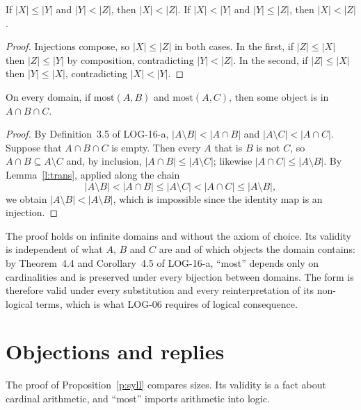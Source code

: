 \documentclass{situationist-preprint}
\begin{document}
\begin{lemma}\label{l:trans}
If $|X| \leq |Y|$ and $|Y| < |Z|$, then $|X| < |Z|$. If $|X| < |Y|$ and $|Y| \leq |Z|$, then $|X| < |Z|$.
\end{lemma}

\begin{proof}
Injections compose, so $|X| \leq |Z|$ in both cases. In the first, if $|Z| \leq |X|$ then $|Z| \leq |Y|$ by composition, contradicting $|Y| < |Z|$. In the second, if $|Z| \leq |X|$ then $|Y| \leq |X|$, contradicting $|X| < |Y|$.
\end{proof}

\begin{proposition}\label{p:syll}
On every domain, if $\mathrm{most}(A, B)$ and $\mathrm{most}(A, C)$, then some object is in $A \cap B \cap C$.
\end{proposition}

\begin{proof}
By Definition~3.5 of LOG-16-a, $|A \setminus B| < |A \cap B|$ and $|A \setminus C| < |A \cap C|$. Suppose that $A \cap B \cap C$ is empty. Then every $A$ that is $B$ is not $C$, so $A \cap B \subseteq A \setminus C$ and, by inclusion, $|A \cap B| \leq |A \setminus C|$; likewise $|A \cap C| \leq |A \setminus B|$. By Lemma~\ref{l:trans}, applied along the chain
\[
|A \setminus B| < |A \cap B| \leq |A \setminus C| < |A \cap C| \leq |A \setminus B|,
\]
we obtain $|A \setminus B| < |A \setminus B|$, which is impossible since the identity map is an injection.
\end{proof}

The proof holds on infinite domains and without the axiom of choice. Its validity is independent of what $A$, $B$ and $C$ are and of which objects the domain contains: by Theorem~4.4 and Corollary~4.5 of LOG-16-a, \enquote{most} depends only on cardinalities and is preserved under every bijection between domains. The form is therefore valid under every substitution and every reinterpretation of its non-logical terms, which is what LOG-06 requires of logical consequence.

\section{Objections and replies}

\begin{objection}
The proof of Proposition~\ref{p:syll} compares sizes. Its validity is a fact about cardinal arithmetic, and \enquote{most} imports arithmetic into logic.
\end{objection}
\end{document}
